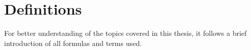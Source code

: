 \chapter{Definitions}\label{ch:definitions}

For better understanding of the topics covered in this thesis,
it follows a brief introduction of all formulas and terms used.



